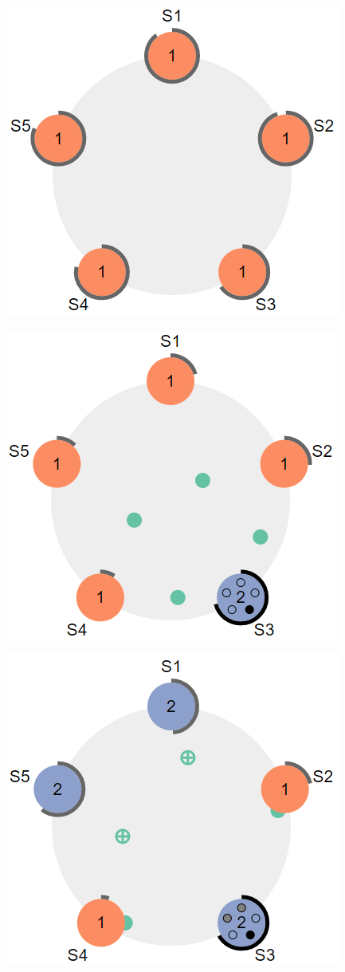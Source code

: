 \documentclass[runningheads]{llncs}
\begin{document}
\begin{figure}
\includegraphics[scale=0.30]{raft_pics/raft1.png}
\end{figure}
\begin{figure}
\includegraphics[scale=0.30]{raft_pics/raft2.png}
\end{figure}
\begin{figure}
\includegraphics[scale=0.30]{raft_pics/raft3.png}
\end{figure}
\end{document}
